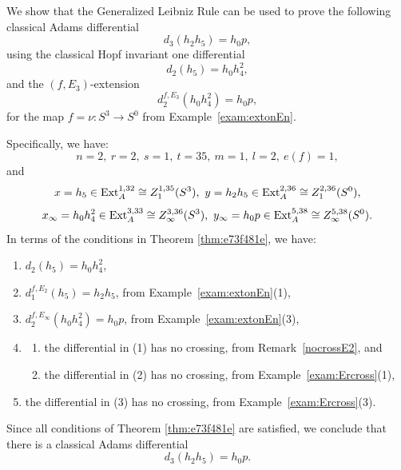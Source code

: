 \documentclass{amsart}
\numberwithin{equation}{section}
\begin{document}
\begin{example} \label{exam:Leibnizyes}
 We show that the Generalized Leibniz Rule can be used to prove the following classical Adams differential
    $$d_3(h_2 h_5) = h_0 p,$$
    using the classical Hopf invariant one differential
    $$d_2(h_5) = h_0 h_4^2,$$
    and the $(f, E_3)$-extension
        $$d_2^{f, E_3} (h_0h_4^2) = h_0 p,$$
        for the map $f = \nu: S^3 \rightarrow S^0$ from Example~\ref{exam:extonEn}.

        Specifically, we have:
        $$n=2, \ r=2, \ s=1, \ t=35, \ m=1, \ l=2, \ e(f)=1,$$
        and 
        $$x=h_5 \in \mathrm{Ext}_A^{1,32} \cong Z_1^{1,35}(S^3), \ y=h_2h_5 \in \mathrm{Ext}_A^{2,36} \cong Z_1^{2,36}(S^0),$$
        $$x_\infty=h_0h_4^2 \in \mathrm{Ext}_A^{3,33} \cong Z_\infty^{3,36}(S^3), \ y_\infty=h_0p \in \mathrm{Ext}_A^{5,38} \cong Z_\infty^{5,38}(S^0).$$
In terms of the conditions in Theorem \ref{thm:e73f481e}, we have:
      \begin{enumerate}
      \item $d_2(h_5) = h_0h_4^2$,
      \item $d_1^{f, E_2}(h_5) = h_2h_5$, from Example~\ref{exam:extonEn}(1),
      \item $d_2^{f, E_\infty} (h_0h_4^2) = h_0 p$, from Example~\ref{exam:extonEn}(3),
      \item 
      \begin{enumerate}
          \item the differential in (1) has no crossing, from Remark~\ref{nocrossE2}, and
          \item the differential in (2) has no crossing, from Example~\ref{exam:Ercross}(1), 
      \end{enumerate}
      \item the differential in (3) has no crossing, from Example~\ref{exam:Ercross}(3).
      \end{enumerate}
      Since all conditions of Theorem \ref{thm:e73f481e} are satisfied, we conclude that there is a classical Adams differential
      $$d_3(h_2 h_5) = h_0 p.$$
\end{example}
\end{document}
